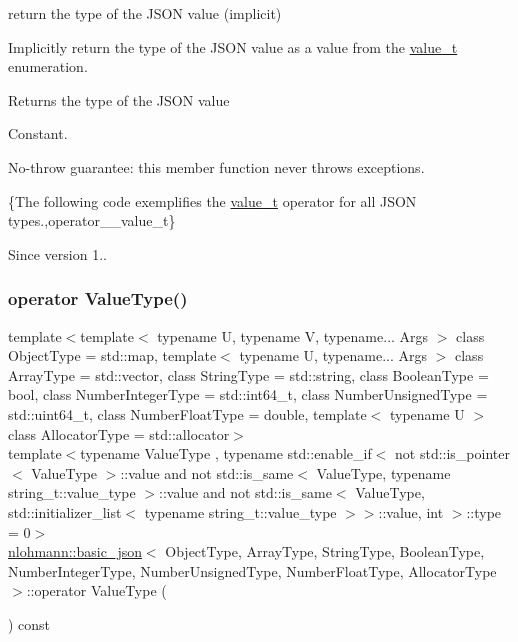 return the type of the J\+S\+ON value (implicit) 

Implicitly return the type of the J\+S\+ON value as a value from the \hyperlink{classnlohmann_1_1basic__json_a231b02148577b69a154b2ce2c87a5522}{value\+\_\+t} enumeration.

\begin{DoxyReturn}{Returns}
the type of the J\+S\+ON value
\end{DoxyReturn}
Constant.

No-\/throw guarantee\+: this member function never throws exceptions.

\{The following code exemplifies the \hyperlink{classnlohmann_1_1basic__json_a231b02148577b69a154b2ce2c87a5522}{value\+\_\+t} operator for all J\+S\+ON types.,operator\+\_\+\+\_\+value\+\_\+t\}

\begin{DoxySince}{Since}
version 1.. 
\end{DoxySince}
\hypertarget{classnlohmann_1_1basic__json_ac5bed64638180098b5db82f8e482d855}{}\label{classnlohmann_1_1basic__json_ac5bed64638180098b5db82f8e482d855} 
\subsubsection{\texorpdfstring{operator Value\+Type()}{operator ValueType()}}
{\footnotesize\ttfamily template$<$template$<$ typename U, typename V, typename... Args $>$ class Object\+Type = std\+::map, template$<$ typename U, typename... Args $>$ class Array\+Type = std\+::vector, class String\+Type  = std\+::string, class Boolean\+Type  = bool, class Number\+Integer\+Type  = std\+::int64\+\_\+t, class Number\+Unsigned\+Type  = std\+::uint64\+\_\+t, class Number\+Float\+Type  = double, template$<$ typename U $>$ class Allocator\+Type = std\+::allocator$>$ \\
template$<$typename Value\+Type , typename std\+::enable\+\_\+if$<$ not std\+::is\+\_\+pointer$<$ Value\+Type $>$\+::value and not std\+::is\+\_\+same$<$ Value\+Type, typename string\+\_\+t\+::value\+\_\+type $>$\+::value and not std\+::is\+\_\+same$<$ Value\+Type, std\+::initializer\+\_\+list$<$ typename string\+\_\+t\+::value\+\_\+type $>$$>$\+::value, int $>$\+::type  = 0$>$ \\
\hyperlink{classnlohmann_1_1basic__json}{nlohmann\+::basic\+\_\+json}$<$ Object\+Type, Array\+Type, String\+Type, Boolean\+Type, Number\+Integer\+Type, Number\+Unsigned\+Type, Number\+Float\+Type, Allocator\+Type $>$\+::operator Value\+Type (\begin{DoxyParamCaption}{ }\end{DoxyParamCaption}) const\hspace{0.3cm}{\ttfamily [inline]}}



